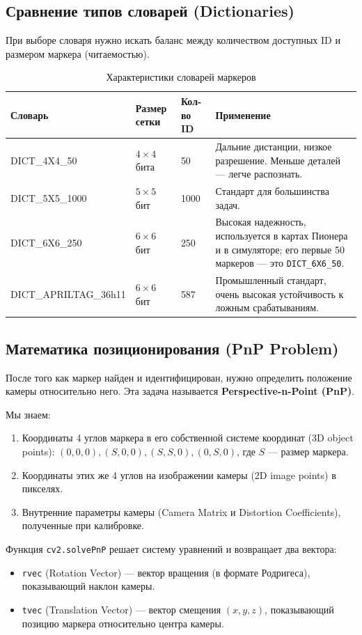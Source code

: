 \subsection{Сравнение типов словарей (Dictionaries)}
При выборе словаря нужно искать баланс между количеством доступных ID и размером маркера (читаемостью).

\begin{table}[H]
\centering
\begin{tabularx}{\textwidth}{|l|X|X|X|}
\hline
\textbf{Словарь} & \textbf{Размер сетки} & \textbf{Кол-во ID} & \textbf{Применение} \\ \hline
DICT\_4X4\_50 & $4 \times 4$ бита & 50 & Дальние дистанции, низкое разрешение. Меньше деталей — легче распознать. \\ \hline
DICT\_5X5\_1000 & $5 \times 5$ бит & 1000 & Стандарт для большинства задач. \\ \hline
DICT\_6X6\_250 & $6 \times 6$ бит & 250 & Высокая надежность, используется в картах Пионера и в симуляторе; его первые 50 маркеров --- это \texttt{DICT\_6X6\_50}. \\ \hline
DICT\_APRILTAG\_36h11 & $6 \times 6$ бит & 587 & Промышленный стандарт, очень высокая устойчивость к ложным срабатываниям. \\ \hline
\end{tabularx}
\caption{Характеристики словарей маркеров}
\end{table}

\subsection{Математика позиционирования (PnP Problem)}
После того как маркер найден и идентифицирован, нужно определить положение камеры относительно него. Эта задача называется \textbf{Perspective-n-Point (PnP)}.

Мы знаем:
\begin{enumerate}
    \item Координаты 4 углов маркера в его собственной системе координат (3D object points): $(0,0,0), (S,0,0), (S,S,0), (0,S,0)$, где $S$ — размер маркера.
    \item Координаты этих же 4 углов на изображении камеры (2D image points) в пикселях.
    \item Внутренние параметры камеры (Camera Matrix и Distortion Coefficients), полученные при калибровке.
\end{enumerate}

Функция \texttt{cv2.solvePnP} решает систему уравнений и возвращает два вектора:
\begin{itemize}
    \item \texttt{rvec} (Rotation Vector) — вектор вращения (в формате Родригеса), показывающий наклон камеры.
    \item \texttt{tvec} (Translation Vector) — вектор смещения $(x, y, z)$, показывающий позицию маркера относительно центра камеры.
\end{itemize}

